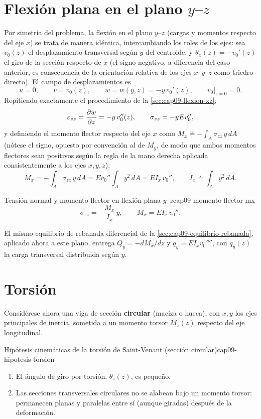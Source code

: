 \section{Flexión plana en el plano \texorpdfstring{$y$--$z$}{y-z}}
\label{sec:cap09-flexion-yz}

Por simetría del problema, la flexión en el plano $y$--$z$ (cargas y momentos respecto del eje $x$) se trata de manera idéntica, intercambiando los roles de los ejes: sea $v_0(z)$ el desplazamiento transversal según $y$ del centroide, y $\theta_x(z)=-v_0'(z)$ el giro de la sección respecto de $x$ (el signo negativo, a diferencia del caso anterior, es consecuencia de la orientación relativa de los ejes $x$--$y$--$z$ como triedro directo). El campo de desplazamientos es
\[
u=0, \qquad v=v_0(z), \qquad w=w(y,z)=-y\,v_0'(z) , \qquad v_0\big|_{z=0}=0 .
\]
Repitiendo exactamente el procedimiento de la \cref{sec:cap09-flexion-xz},
\[
\varepsilon_{zz}=\pdv{w}{z}=-y\,v_0''(z), \qquad \sigma_{zz}=-yEv_0'' ,
\]
y definiendo el momento flector respecto del eje $x$ como $M_x\doteq-\int_A\sigma_{zz}\,y\,dA$ (nótese el signo, opuesto por convención al de $M_y$, de modo que ambos momentos flectores sean positivos según la regla de la mano derecha aplicada consistentemente a los ejes $x,y,z$):
\[
M_x = -\int_A\sigma_{zz}\,y\,dA = Ev_0''\int_A y^2\,dA = EI_x\,v_0'' , \qquad I_x\doteq\int_A y^2\,dA .
\]

\begin{ecnimportante}{Tensión normal y momento flector en flexión plana \texorpdfstring{$y$--$z$}{y-z}}{cap09-momento-flector-mx}
\[
\sigma_{zz} = -\frac{M_x}{I_x}\,y , \qquad M_x = EI_x\,v_0'' .
\]
\end{ecnimportante}

El mismo equilibrio de rebanada diferencial de la \cref{sec:cap09-equilibrio-rebanada}, aplicado ahora a este plano, entrega $Q_y=-dM_x/dz$ y $q_y=EI_x v_0''''$, con $q_y(z)$ la carga transversal distribuida según $y$.

\section{Torsión}
\label{sec:cap09-torsion}

Considérese ahora una viga de sección \textbf{circular} (maciza o hueca), con $x,y$ los ejes principales de inercia, sometida a un momento torsor $M_z(z)$ respecto del eje longitudinal.

\begin{definicion}{Hipótesis cinemáticas de la torsión de Saint-Venant (sección circular)}{cap09-hipotesis-torsion}
\begin{enumerate}[leftmargin=1.8em]
  \item El ángulo de giro por torsión, $\theta_z(z)$, es pequeño.
  \item Las secciones transversales circulares no se alabean bajo un momento torsor: permanecen planas y paralelas entre sí (aunque giradas) después de la deformación.
\end{enumerate}
\end{definicion}

